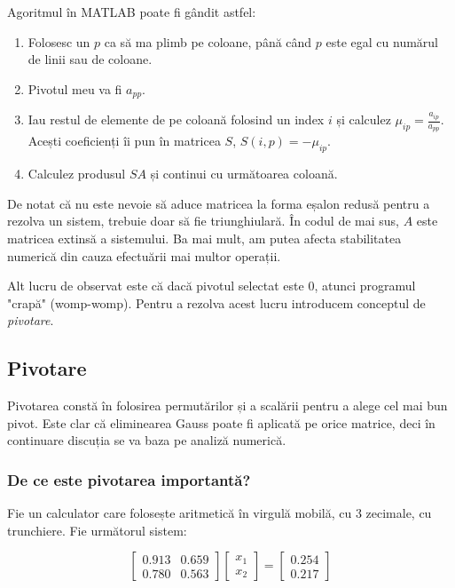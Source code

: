 \documentclass{exam}
\newcommand{\octavescript}[2]{
	
}
\begin{document}
\par Agoritmul în MATLAB poate fi gândit astfel:

\begin{enumerate}
	\item Folosesc un $p$ ca să ma plimb pe coloane, până când $p$ este egal
	      cu numărul de linii sau de coloane.
	\item Pivotul meu va fi $a_{pp}$.
	\item Iau restul de elemente de pe coloană folosind un index $i$ și calculez
	      $\mu_{ip} = \frac{a_{ip}}{a_{pp}}$. Acești coeficienți îi pun în
	      matricea $S$, $S(i, p) = -\mu_{ip}$.
	\item Calculez produsul $SA$ și continui cu următoarea coloană.
\end{enumerate}

\newpage
\octavescript{./src/G.m}{}

\par De notat că nu este nevoie să aduce matricea la forma eșalon redusă pentru
a rezolva un sistem, trebuie doar să fie triunghiulară. În codul de mai sus, $A$
este matricea extinsă a sistemului. Ba mai mult, am putea afecta stabilitatea
numerică din cauza efectuării mai multor operații.

\par Alt lucru de observat este că dacă pivotul selectat este 0, atunci
programul "crapă" (womp-womp). Pentru a rezolva acest lucru introducem
conceptul de \textit{pivotare}.

\subsection{Pivotare}

\par Pivotarea constă în folosirea permutărilor și a scalării pentru a alege
cel mai bun pivot. Este clar că eliminearea Gauss poate fi aplicată pe orice
matrice, deci în continuare discuția se va baza pe analiză numerică.

\subsubsection{De ce este pivotarea importantă?}

\par Fie un calculator care folosește aritmetică în virgulă mobilă, cu 3
zecimale, cu trunchiere. Fie următorul sistem:

\begin{equation*}
	\begin{bmatrix}
		0.913 & 0.659 \\
		0.780 & 0.563
	\end{bmatrix}
	\begin{bmatrix}
		x_1 \\
		x_2
	\end{bmatrix}
	=
	\begin{bmatrix}
		0.254 \\
		0.217
	\end{bmatrix}
\end{equation*}
\end{document}
